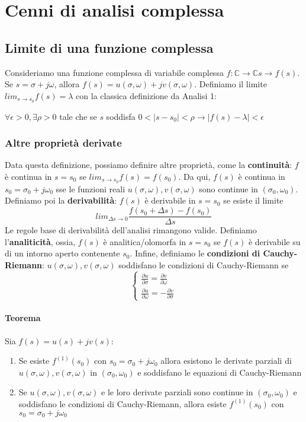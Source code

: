 \documentclass[11pt]{article}
\begin{document}
\section{Cenni di analisi complessa}
\subsection{Limite di una funzione complessa}
Consideriamo una funzione complessa di variabile complessa $f: \mathbb{C} \rightarrow \mathbb{C} s \rightarrow f(s)$. Se $s = \sigma + j \omega$, allora $f(s) = u(\sigma, \omega)+ jv(\sigma, \omega)$. Definiamo il limite $lim_{s\rightarrow s_0} f(s) = \lambda$ con la classica definizione da Analisi 1:
\begin{center}
    $\forall \epsilon >0, \exists \rho >0$ tale che se $s$ soddisfa $0<|s-s_0|<\rho \rightarrow |f(s) - \lambda| < \epsilon$
\end{center}
\subsubsection{Altre proprietà derivate}
Data questa definizione, possiamo definire altre proprietà, come la \textbf{continuità}: $f$ è continua in $s=s_0$ se $lim_{s\rightarrow s_0} f(s) = f(s_0)$. Da qui, $f(s)$ è continua in $s_0 = \sigma_0 + j\omega_0$ sse le funzioni reali $u(\sigma, \omega), v(\sigma, \omega)$ sono continue in $(\sigma_0, \omega_0)$. Definiamo poi la \textbf{derivabilità}: $f(s)$ è derivabile in $s=s_0$ se esiste il limite
\begin{displaymath}
    lim_{\Delta s\rightarrow 0} \frac{f(s_0 + \Delta s) - f(s_0)}{\Delta s}
\end{displaymath}
Le regole base di derivabilità dell'analisi rimangono valide. Definiamo l'\textbf{analiticità}, ossia, $f(s)$ è analitica/olomorfa in $s=s_0$ se $f(s)$ è derivabile su di un intorno aperto contenente $s_0$.
Infine, definiamo le \textbf{condizioni di Cauchy-Riemann}: $u(\sigma, \omega), v(\sigma, \omega)$ soddisfano le condizioni di Cauchy-Riemann se
\begin{displaymath}
    \begin{cases}
        \frac{\partial u}{\partial \sigma} = \frac{\partial v}{\partial \omega} \\ \frac{\partial u}{\partial \omega} = - \frac{\partial v}{\partial \sigma}
    \end{cases}
\end{displaymath}
\paragraph{Teorema}
Sia $f(s) = u(s) + jv(s)$:
\begin{enumerate}
    \item Se esiste $f^{(1)} (s_0)$ con $s_0 = \sigma_0 + j\omega_0$ allora esistono le derivate parziali di $u(\sigma, \omega), v(\sigma, \omega)$ in $(\sigma_0, \omega_0)$ e soddisfano le equazioni di Cauchy-Riemann
    \item Se $u(\sigma, \omega), v(\sigma, \omega)$ e le loro derivate parziali sono continue in $(\sigma_0, \omega_0)$ e soddisfano le condizioni di Cauchy-Riemann, allora esiste $f^{(1)} (s_0)$ con $s_0 = \sigma_0 + j\omega_0$
\end{enumerate}
\end{document}
